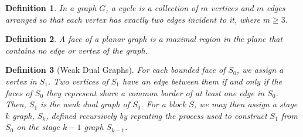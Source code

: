 \documentclass[10pt]{article}
\newtheorem{definition}{Definition}
\begin{document}
\begin{definition}
In a graph $G$, a cycle is a collection of $m$ vertices and $m$ edges arranged so that each vertex has exactly two edges incident to it, where $m \ge 3$.
\end{definition}

\begin{definition}
A face of a planar graph is a maximal region in the plane that contains no edge or vertex of the graph.
\end{definition}

\begin{definition}[Weak Dual Graphs]
For each bounded face of $S_0$, we assign a vertex in $S_1$. Two vertices of $S_1$ have an edge between them if and only if the faces of $S_0$ they represent share a common border of at least one edge in $S_0$. Then, $S_1$ is the weak dual graph of $S_0$. For a block $S$, we may then assign a stage $k$ graph, $S_k$, defined recursively by repeating the process used to construct $S_1$ from $S_0$ on the stage $k-1$ graph $S_{k-1}$.
\end{definition}
\end{document}
